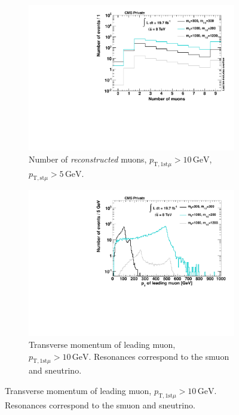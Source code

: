 \begin{figure}[!htbp]
  \centering
  \begin{subfigure}[b]{0.495\textwidth}
    \centering
    \includegraphics[width=\textwidth]{plots/sig_muo_n.pdf}
    \caption{Number of \textit{reconstructed} muons, $p_{\text{T}, 1\text{st} \mu} > 10\,\text{GeV}$, $p_{\text{T}, \text{st} \mu} > 5\,\text{GeV}$.\label{fig:sig_muo_n}}
  \end{subfigure}
  \begin{subfigure}[b]{0.495\textwidth}
    \centering
    \includegraphics[width=\textwidth]{plots/sig_muo_pt1.pdf}
    \caption{Transverse momentum of leading muon, $p_{\text{T}, 1\text{st} \mu} > 10\,\text{GeV}$. Resonances correspond to the smuon and sneutrino\footnotemark.\label{fig:sig_muo_pt1}}
  \end{subfigure}
\end{figure}

